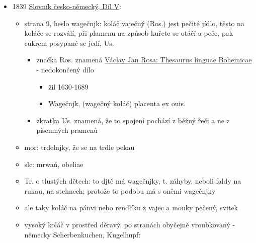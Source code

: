 \begin{itemize}
  \begin{itemize}
  \tightlist
  \item
    na straně 624 docela přesnej popis, zmiňuje alternativní názvy
    vagečnjk (vaječník?) a kotúč
  \item
    trdelnjk, u, m, (r. trdlo, protože na trdle, t. dřewěném rožni se
    pekau), pečivo z mauky, ginak: wagečnjk, slc. též kotúč, Ringel-
    ober Spieß- ober Prügelkrapfen, Ringkuchen, obelia, D. torta
    annularia, Brn (z Brněnska?). placenta in veru ligneo cocta. Plk
    (Palkovič?)
  \item
    pak následujou ukázky z Múz morawských
  \end{itemize}
\item
  1839
  \href{https://vokabular.ujc.cas.cz/moduly/slovniky/digitalni-kopie-detail/JgSlov05/strana-9}{Slovník
  česko-německý, Díl V}:

  \begin{itemize}
  \tightlist
  \item
    strana 9, heslo wagečnjk: koláč vaječný (Ros.) jest pečité jídlo,
    těsto na koláče se rozválí, při plamenu na způsob kuřete se otáčí a
    peče, pak cukrem posypané se jedí, Us.

    \begin{itemize}
    \tightlist
    \item
      značka Ros. znamená
      \href{https://bara.ujc.cas.cz/slovniky/rosa/rosafst1480.html}{Václav
      Jan Rosa: Thesaurus linguae Bohemicae} - nedokončený dílo

      \begin{itemize}
      \tightlist
      \item
        žil 1630-1689
      \item
        Wagečnjk, (wagečný kołáč) placenta ex ouis.
      \end{itemize}
    \item
      zkratka Us. znamená, že to spojení pochází z běžný řeči a ne z
      písemných pramenů
    \end{itemize}
  \item
    mor: trdelnjky, že se na trdle pekau
  \item
    slc: mrwaň, obeliae
  \item
    Tr. o tlustých dětech: to djtě má wagečnjky, t. záhyby, neboli faldy
    na rukau, na stehnech; protože to podobu má s oněmi wagečnjky
  \item
    ale taky koláč na pánvi nebo rendlíku z vajec a mouky pečený, svitek
  \item
    vysoký koláč v prostřed děravý, po stranách obyčejně vroubkovaný -
    německy Scherbenkuchen, Kugelhupf:


\end{itemize}
\end{itemize}
